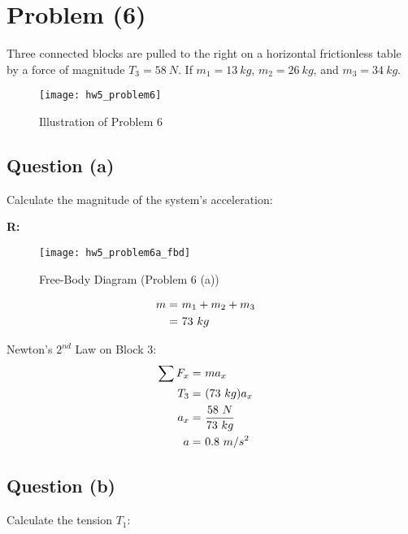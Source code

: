 \section{Problem (6)}
	Three connected blocks are pulled to the right on a horizontal frictionless table by a force of magnitude $T_{3} = 58 \ N$. If $m_{1} = 13 \ kg$, $m_{2} = 26 \ kg$, and $m_{3} = 34 \ kg$.

	\begin{figure}[H]
		\begin{center}
			\texttt{[image: hw5\_problem6]}
			\caption{Illustration of Problem 6}
			\label{fig:hw5_problem6}
		\end{center}
	\end{figure}

	\subsection{Question (a)}

		Calculate the magnitude of the system's acceleration:

		\textbf{R:} \newline

		\begin{figure}[H]
			\begin{center}
				\texttt{[image: hw5\_problem6a\_fbd]}
				\caption{Free-Body Diagram (Problem 6 (a))}
				\label{fig:hw5_problem6a_fbd}
			\end{center}
		\end{figure}

		\begin{align}
			m = \ &m_{1} + m_{2} + m_{3}& \notag \\
			= \ &73 \ kg& \notag
		\end{align}

		Newton's $2^{nd}$ Law on Block $3$:
		\begin{align}
			\sum F_{x} = \ &ma_{x}& \notag \\
			T_{3} = \ &(73 \ kg)a_{x}& \notag \\
			a_{x} = \ &\frac{58 \ N}{73 \ kg}& \notag \\
			a = \ &0.8 \ m/s^{2}&
		\end{align}

	\subsection{Question (b)}

		Calculate the tension $T_{1}$:

